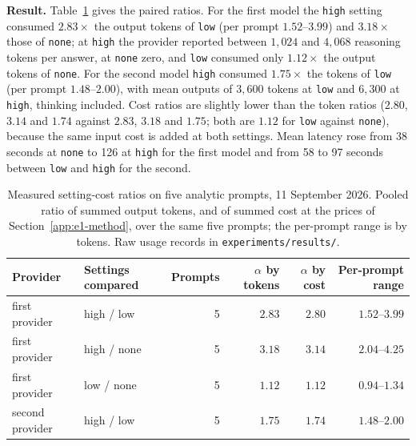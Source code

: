 \documentclass[11pt]{article}
\begin{document}
\textbf{Result.} Table~\ref{tab:alpha} gives the paired ratios. For the first model the
\texttt{high} setting consumed $2.83\times$ the output tokens of \texttt{low} (per prompt
$1.52$--$3.99$) and $3.18\times$ those of \texttt{none}; at \texttt{high} the provider
reported between $1{,}024$ and $4{,}068$ reasoning tokens per answer, at \texttt{none}
zero, and \texttt{low} consumed only $1.12\times$ the output tokens of \texttt{none}. For the second model
\texttt{high} consumed $1.75\times$ the tokens of \texttt{low} (per prompt $1.48$--$2.00$),
with mean outputs of $3{,}600$ tokens at \texttt{low} and $6{,}300$ at \texttt{high}, thinking included. Cost ratios are slightly
lower than the token ratios ($2.80$, $3.14$ and $1.74$ against $2.83$, $3.18$ and $1.75$; both are $1.12$ for \texttt{low} against \texttt{none}), because the same input cost is added at both settings. Mean
latency rose from 38 seconds at \texttt{none} to 126 at \texttt{high} for the first model and from 58 to 97 seconds between \texttt{low} and \texttt{high} for the second.

\begin{table}[ht]
\centering
\begin{tabular}{llrrrr}
\toprule
Provider & Settings compared & Prompts & $\alpha$ by tokens & $\alpha$ by cost & Per-prompt range \\
\midrule
first provider & high / low & 5 & $2.83$ & $2.80$ & $1.52$--$3.99$ \\
first provider & high / none & 5 & $3.18$ & $3.14$ & $2.04$--$4.25$ \\
first provider & low / none & 5 & $1.12$ & $1.12$ & $0.94$--$1.34$ \\
second provider & high / low & 5 & $1.75$ & $1.74$ & $1.48$--$2.00$ \\
\bottomrule
\end{tabular}
\caption{Measured setting-cost ratios on five analytic prompts, 11 September 2026.
Pooled ratio of summed output tokens, and of summed cost at the prices of Section~\ref{app:e1-method}, over the same five prompts; the per-prompt range is by tokens. Raw usage records in
\texttt{experiments/results/}.}
\label{tab:alpha}
\end{table}
\end{document}
